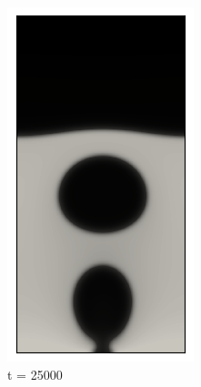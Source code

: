 \begin{figure}[h!]
	\medskip
	\begin{subfigure}{0.25\textwidth}
		\includegraphics[width=\linewidth]{figs/cap4/bubble_25}
		\caption{t = 25000}
		\label{fig:4}
	\end{subfigure}\hfil  
	\begin{subfigure}{0.25\textwidth}

\end{subfigure}
\end{figure}
